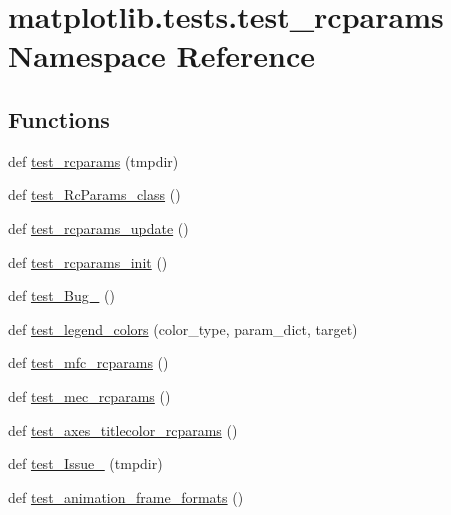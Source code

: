 \hypertarget{namespacematplotlib_1_1tests_1_1test__rcparams}{}\section{matplotlib.\+tests.\+test\+\_\+rcparams Namespace Reference}
\label{namespacematplotlib_1_1tests_1_1test__rcparams}
\subsection*{Functions}
\begin{DoxyCompactItemize}
\item 
def \hyperlink{namespacematplotlib_1_1tests_1_1test__rcparams_ad9e3b96a6302eb1b8a34d79ea99557a4}{test\+\_\+rcparams} (tmpdir)
\item 
def \hyperlink{namespacematplotlib_1_1tests_1_1test__rcparams_a00b57accaca9e226c4e8621426d24d7b}{test\+\_\+\+Rc\+Params\+\_\+class} ()
\item 
def \hyperlink{namespacematplotlib_1_1tests_1_1test__rcparams_ac5d8d41ae0784c7e8d62462e8618b956}{test\+\_\+rcparams\+\_\+update} ()
\item 
def \hyperlink{namespacematplotlib_1_1tests_1_1test__rcparams_a54ddf3378b53ec9067c3b3e2317d0efb}{test\+\_\+rcparams\+\_\+init} ()
\item 
def \hyperlink{namespacematplotlib_1_1tests_1_1test__rcparams_ae7e219248d09d79c14d83e3e7c4b59b7}{test\+\_\+\+Bug\+\_} ()
\item 
def \hyperlink{namespacematplotlib_1_1tests_1_1test__rcparams_ad7f447970fd21ee70f09b02d83adc4d3}{test\+\_\+legend\+\_\+colors} (color\+\_\+type, param\+\_\+dict, target)
\item 
def \hyperlink{namespacematplotlib_1_1tests_1_1test__rcparams_acab340be5de10b0f2fa467c8eaeb2c24}{test\+\_\+mfc\+\_\+rcparams} ()
\item 
def \hyperlink{namespacematplotlib_1_1tests_1_1test__rcparams_a7dc4f65e54f7d90db1b63a4a0dc85a98}{test\+\_\+mec\+\_\+rcparams} ()
\item 
def \hyperlink{namespacematplotlib_1_1tests_1_1test__rcparams_ac40ed5cd209dc1a576e3ca4014fec7a1}{test\+\_\+axes\+\_\+titlecolor\+\_\+rcparams} ()
\item 
def \hyperlink{namespacematplotlib_1_1tests_1_1test__rcparams_a4c1f7b50b5ed5210502f399464ffab27}{test\+\_\+\+Issue\+\_} (tmpdir)
\item 
def \hyperlink{namespacematplotlib_1_1tests_1_1test__rcparams_af0e364b5ae20e866e424e85aef4d0c25}{test\+\_\+animation\+\_\+frame\+\_\+formats} ()

\end{DoxyCompactItemize}
